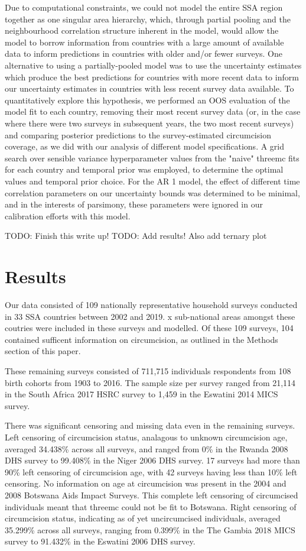\documentclass[a4paper, 12pt]{article}
\begin{document}
Due to computational constraints, we could not model the entire SSA region together as one singular area hierarchy, which, through partial pooling and the neighbourhood correlation structure inherent in the model, would allow the model to borrow information from countries with a large amount of available data to inform predictions in countries with older and/or fewer surveys.
One alternative to using a partially-pooled model was to use the uncertainty estimates which produce the best predictions for countries with more recent data to inform our uncertainty estimates in countries with less recent survey data available.
To quantitatively explore this hypothesis, we performed an OOS evaluation of the model fit to each country, removing their most recent survey data (or, in the case where there were two surveys in subsequent years, the two most recent surveys) and comparing posterior predictions to the survey-estimated circumcision coverage, as we did with our analysis of different model specifications.
A grid search over sensible variance hyperparameter values from the "naive" threemc fits for each country and temporal prior was employed, to determine the optimal values and temporal prior choice. 
For the AR 1 model, the effect of different time correlation parameters on our uncertainty bounds was determined to be minimal, and in the interests of parsimony, these parameters were ignored in our calibration efforts with this model.

TODO: Finish this write up!
TODO: Add results! Also add ternary plot 

\section{Results}
\label{sec:orgfc68fc8}
Our data consisted of 109 nationally representative household surveys conducted in 33 SSA countries between 2002 and 2019.
x sub-national areas amongst these coutries were included in these surveys and modelled.
Of these 109 surveys, 104 contained sufficent information on circumcision, as outlined in the Methods section of this paper. 

These remaining surveys consisted of 711,715 individuals respondents from 108 birth cohorts from 1903 to 2016. The sample size per survey ranged from 21,114 in the South Africa 2017 HSRC survey to 1,459 in the Eswatini 2014 MICS survey.

There was significant censoring and missing data even in the remaining surveys. 
Left censoring of circumcision status, analagous to unknown circumcision age, averaged  34.438\% across all surveys, and ranged from 0\% in the Rwanda 2008 DHS survey to 99.408\% in the Niger 2006 DHS survey.
17 surveys had more than 90\% left censoring of circumcision age, with 42 surveys having less than 10\% left censoring.
No information on age at circumcision was present in the 2004 and 2008 Botswana Aids Impact Surveys. This complete left censoring of circumcised individuals meant that threemc could not be fit to Botswana. 
Right censoring of circumcision status, indicating as of yet uncircumcised individuals, averaged 35.299\% across all surveys, ranging from 0.399\% in the The Gambia 2018 MICS survey to 91.432\% in the Eswatini 2006 DHS survey.
\end{document}
